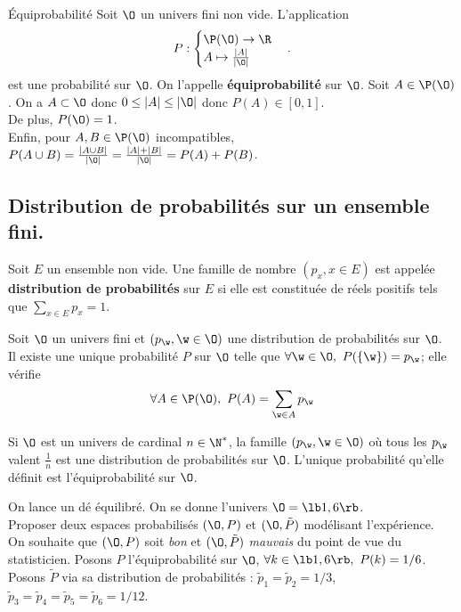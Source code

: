 \documentclass[11pt]{article}
\begin{document}
\begin{prop}{Équiprobabilité}{}
    Soit $\O$ un univers fini non vide. L'application
    \begin{equation*}
        P:\begin{cases}\P(\O)\to\R\\A\mapsto\frac{|A|}{|\O|}\end{cases}.
    \end{equation*}
    est une probabilité sur $\O$. On l'appelle \textbf{équiprobabilité} sur $\O$.
    \tcblower
    Soit $A\in\P(\O)$. On a $A\subset\O$ donc $0\leq|A|\leq|\O|$ donc $P(A)\in[0,1]$.\\
    De plus, $P(\O)=1$.\\
    Enfin, pour $A,B\in\P(\O)$ incompatibles, $P(A\cup B)=\frac{|A\cup B|}{|\O|}=\frac{|A|+|B|}{|\O|}=P(A)+P(B)$.
\end{prop}

\subsection{Distribution de probabilités sur un ensemble fini.}

\begin{defi}{}{}
    Soit $E$ un ensemble non vide. Une famille de nombre $(p_x,x\in E)$ est appelée \textbf{distribution de probabilités} sur $E$ si elle est constituée de réels positifs tels que $\sum\limits_{x\in E}p_x=1$.
\end{defi}

\begin{prop}{}{}
    Soit $\O$ un univers fini et $(p_\w,\w\in\O)$ une distribution de probabilités sur $\O$.\\
    Il existe une unique probabilité $P$ sur $\O$ telle que $\forall \w\in\O,~P(\{\w\})=p_\w$; elle vérifie
    \begin{equation*}
        \forall A\in\P(\O), ~ P(A)=\sum_{\w\in A}p_\w
    \end{equation*}
\end{prop}

\begin{ex}{}{}
    Si $\O$ est un univers de cardinal $n\in\N^*$, la famille $(p_\w,\w\in\O)$ où tous les $p_\w$ valent $\frac{1}{n}$ est une distribution de probabilités sur $\O$. L'unique probabilité qu'elle définit est l'équiprobabilité sur $\O$.
\end{ex}

\begin{ex}{}{}
    On lance un dé équilibré. On se donne l'univers $\O=\lb1,6\rb$.\\
    Proposer deux espaces probabilisés $(\O,P)$ et $(\O,\tilde{P})$ modélisant l'expérience.\\
    On souhaite que $(\O,P)$ soit \emph{bon} et $(\O,\tilde{P})$ \emph{mauvais} du point de vue du statisticien.
    \tcblower
    Posons $P$ l'équiprobabilité sur $\O$, $\forall k\in\lb1,6\rb,~P(k)=1/6$.\\
    Posons $\tilde{P}$ via sa distribution de probabilités : $\tilde{p}_1=\tilde{p}_2=1/3$, $\tilde{p}_3=\tilde{p}_4=\tilde{p}_5=\tilde{p}_6=1/12$.
\end{ex}
\end{document}
